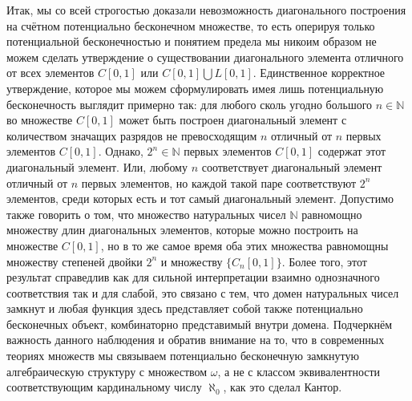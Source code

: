 \documentclass[12pt]{article}
\begin{document}
Итак, мы со всей строгостью доказали невозможность диагонального построения на счётном потенциально бесконечном множестве, то есть оперируя только потенциальной бесконечностью и понятием предела мы никоим образом не можем сделать утверждение о существовании диагонального элемента отличного от всех элементов $C[0, 1]$ или $C[0, 1] \bigcup L[0, 1]$. Единственное корректное утверждение, которое мы можем сформулировать имея лишь потенциальную бесконечность выглядит примерно так: для любого сколь угодно большого $n \in \mathbb{N}$ во множестве $C[0, 1]$ может быть построен диагональный элемент с количеством значащих разрядов не превосходящим $n$ отличный от $n$ первых элементов $C[0, 1]$. Однако, $2^n \in \mathbb{N}$ первых элементов $C[0, 1]$ содержат этот диагональный элемент. Или, любому $n$ соответствует диагональный элемент отличный от $n$ первых элементов, но каждой такой паре соответствуют $2^n$ элементов, среди которых есть и тот самый диагональный элемент. Допустимо также говорить о том, что множество натуральных чисел $\mathbb{N}$ равномощно множеству длин диагональных элементов, которые можно построить на множестве $C[0, 1]$, но в то же самое время оба этих множества равномощны множеству степеней двойки $2^n$ и множеству $\{C_n[0, 1]\}$. Более того, этот результат справедлив как для сильной интерпретации взаимно однозначного соответствия так и для слабой, это связано с тем, что домен натуральных чисел замкнут и любая функция здесь представляет собой также потенциально бесконечных объект, комбинаторно представимый внутри домена. Подчеркнём важность данного наблюдения и обратив внимание на то, что в современных теориях множеств мы связываем потенциально бесконечную замкнутую алгебраическую структуру с множеством $\omega$, а не с классом эквивалентности соответствующим кардинальному числу $\aleph_0$, как это сделал Кантор. 
\end{document}

